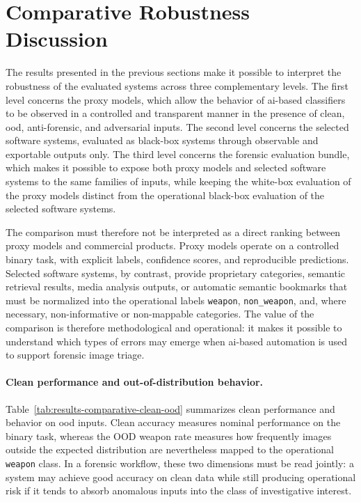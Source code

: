 \section{Comparative Robustness Discussion}
\label{sec:results-comparative}

The results presented in the previous sections make it possible to interpret
the robustness of the evaluated systems across three complementary levels. The
first level concerns the proxy models, which allow the behavior of
\gls{ai}-based classifiers to be observed in a controlled and transparent
manner in the presence of clean, \gls{ood}, anti-forensic, and adversarial
inputs. The second level concerns the selected software systems, evaluated as
black-box systems through observable and exportable outputs only. The third
level concerns the forensic evaluation bundle, which makes it possible to
expose both proxy models and selected software systems to the same families of
inputs, while keeping the white-box evaluation of the proxy models distinct
from the operational black-box evaluation of the selected software systems.

The comparison must therefore not be interpreted as a direct ranking between
proxy models and commercial products. Proxy models operate on a controlled
binary task, with explicit labels, confidence scores, and reproducible
predictions. Selected software systems, by contrast, provide proprietary
categories, semantic retrieval results, media analysis outputs, or automatic
semantic bookmarks that must be normalized into the operational labels
\texttt{weapon}, \texttt{non\_weapon}, and, where necessary, non-informative or
non-mappable categories. The value of the comparison is therefore methodological
and operational: it makes it possible to understand which types of errors may
emerge when \gls{ai}-based automation is used to support forensic image triage.

\paragraph{Clean performance and out-of-distribution behavior.}

Table~\ref{tab:results-comparative-clean-ood} summarizes clean performance and
behavior on \gls{ood} inputs. Clean accuracy measures nominal performance on
the binary task, whereas the OOD weapon rate measures how frequently images
outside the expected distribution are nevertheless mapped to the operational
\texttt{weapon} class. In a forensic workflow, these two dimensions must be
read jointly: a system may achieve good accuracy on clean data while still
producing operational risk if it tends to absorb anomalous inputs into the
class of investigative interest.



